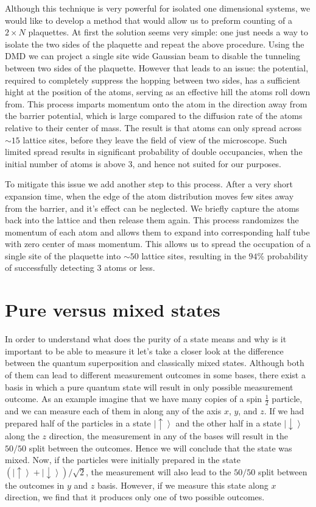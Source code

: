  Although this technique is very powerful for isolated one dimensional systems, we would like to develop a method that would allow us to preform counting of a $2\times N$ plaquettes. At first the solution seems very simple: one just needs a way to isolate the two sides of the plaquette and repeat the above procedure. Using the DMD we can project a single site wide Gaussian beam to disable the tunneling between two sides of the plaquette. However that leads to an issue: the potential, required to completely suppress the hopping between two sides, has a sufficient hight at the position of the atoms, serving as an effective hill the atoms roll down from. This process imparts momentum onto the atom in the direction away from the barrier potential, which is large compared to the diffusion rate of the atoms relative to their center of mass. The result is that atoms can only spread across $\sim 15$ lattice sites, before they leave the field of view of the microscope. Such limited spread results in significant probability of double occupancies, when the initial number of atoms is above $3$, and hence not suited for our purposes.
 
 To mitigate this issue we add another step to this process. After a very short expansion time, when the edge of the atom distribution moves few sites away from the barrier, and it's effect can be neglected. We briefly capture the atoms back into the lattice and then release them again. This process randomizes the momentum of each atom and allows them to expand into corresponding half tube with zero center of mass momentum. This allows us to spread the occupation of a single site of the plaquette into $\sim 50$ lattice sites, resulting in the $94\%$ probability of successfully detecting $3$ atoms or less.
 
  \section{Pure versus mixed states}
In order to understand what does the purity of a state means and why is it important to be able to measure it let's take a closer look at the difference between the quantum superposition and classically mixed states. Although both of them can lead to different measurement outcomes in some bases, there exist a basis in which a pure quantum state will result in only possible measurement outcome. As an example imagine that we have many copies of a spin $\frac{1}{2}$ particle, and we can  measure each of them in along any of the axis $x$, $y$, and $z$. If we had prepared half of the particles in a state $\left| \uparrow \right>$ and the other half in a state $\left| \downarrow \right>$ along the $z$ direction, the measurement in any of the bases will result in the $50/50$ split between the outcomes. Hence we will conclude that the state was mixed. Now, if the particles were initially prepared in the state $(\left| \uparrow  \right>+ \left| \downarrow  \right>)/\sqrt{2}$, the measurement will also lead to the $50/50$ split between the outcomes in $y$ and $z$ basis. However, if we measure this state along $x$ direction, we find that it produces only one of two possible outcomes. 
 
